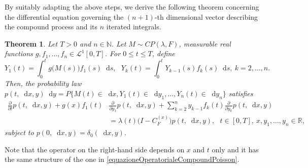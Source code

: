 \documentclass[12pt, twoside, english, headsepline]{article}
\newcommand*\dif{\mathop{}\!\mathrm{d}}  %
\newtheorem{theorem}{Theorem}[section] %
\theoremstyle{definition} %
\numberwithin{equation}{section} %
\begin{document}
By suitably adapting the above steps, we derive the following theorem concerning the differential equation governing the $(n+1)$-th dimensional vector describing the compound process and its $n$ iterated integrals.

\begin{theorem}
	Let $T>0$ and $n\in\mathbb{N}$. Let $M\sim CP(\lambda, F)$, measurable real functions $g,f_1,\dots,f_n\in\mathcal{L}^1[0,T]$. For $0\le t\le T$, define
	$$Y_1(t) = \int_0^t g\big(M(s)\big) f_1(s) \dif s,\ \ \ Y_k(t) = \int_0^t Y_{k-1}(s)f_k(s)\dif s,\ k=2,\dots, n. $$
	Then, the probability law $p(t,\dif x, y)\dif y = P\{M(t)\in\dif x, Y_1(t)\in \dif y_1,\dots, Y_n(t)\in \dif y_n\}$ satisfies
	\begin{align}
		\frac{\partial}{\partial t}p(t, \dif x, y)+ g(x)f_1(t)& \frac{\partial}{\partial y_1}p(t, \dif x, y) + \sum_{k=2}^n y_{k-1} f_k(t)\frac{\partial}{\partial y_{k}}p(t, \dif x, y) \nonumber\\
		& = \lambda(t) \Big(I-C_F^{(x)}\Big) p(t, \dif x, y) , \ \ \ t\in [0,T],\ x,y_1,\dots,y_n \in\mathbb{R}, \label{equazioneCompoundPoissonIntegraliIterati}
	\end{align}	
	subject to $p(0,\dif x, y) = \delta_0(\dif x, y)$.
\end{theorem}

Note that the operator on the right-hand side depends on $x$ and $t$ only and it has the same structure of the one in \eqref{equazioneOperatorialeCompoundPoisson}. 
\end{document}
